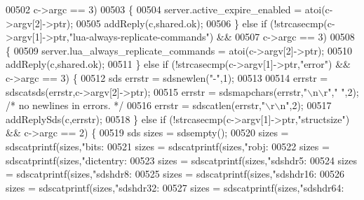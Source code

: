 \begin{DoxyCode}
{{{{{{{{{{{{{{{{{00502                c->argc == 3)
00503     \{
00504         server.active\_expire\_enabled = atoi(c->argv[2]->ptr);
00505         addReply(c,shared.ok);
00506     \} \textcolor{keywordflow}{else} \textcolor{keywordflow}{if} (!strcasecmp(c->argv[1]->ptr,\textcolor{stringliteral}{"lua-always-replicate-commands"}) &&
00507                c->argc == 3)
00508     \{
00509         server.lua\_always\_replicate\_commands = atoi(c->argv[2]->ptr);
00510         addReply(c,shared.ok);
00511     \} \textcolor{keywordflow}{else} \textcolor{keywordflow}{if} (!strcasecmp(c->argv[1]->ptr,\textcolor{stringliteral}{"error"}) && c->argc == 3) \{
00512         sds errstr = sdsnewlen(\textcolor{stringliteral}{"-"},1);
00513 
00514         errstr = sdscatsds(errstr,c->argv[2]->ptr);
00515         errstr = sdsmapchars(errstr,\textcolor{stringliteral}{"\(\backslash\)n\(\backslash\)r"},\textcolor{stringliteral}{"  "},2); \textcolor{comment}{/* no newlines in errors. */}
00516         errstr = sdscatlen(errstr,\textcolor{stringliteral}{"\(\backslash\)r\(\backslash\)n"},2);
00517         addReplySds(c,errstr);
00518     \} \textcolor{keywordflow}{else} \textcolor{keywordflow}{if} (!strcasecmp(c->argv[1]->ptr,\textcolor{stringliteral}{"structsize"}) && c->argc == 2) \{
00519         sds sizes = sdsempty();
00520         sizes = sdscatprintf(sizes,\textcolor{stringliteral}{"bits:%
00521         sizes = sdscatprintf(sizes,\textcolor{stringliteral}{"robj:%
00522         sizes = sdscatprintf(sizes,\textcolor{stringliteral}{"dictentry:%
00523         sizes = sdscatprintf(sizes,\textcolor{stringliteral}{"sdshdr5:%
00524         sizes = sdscatprintf(sizes,\textcolor{stringliteral}{"sdshdr8:%
00525         sizes = sdscatprintf(sizes,\textcolor{stringliteral}{"sdshdr16:%
00526         sizes = sdscatprintf(sizes,\textcolor{stringliteral}{"sdshdr32:%
00527         sizes = sdscatprintf(sizes,\textcolor{stringliteral}{"sdshdr64:%
}}}}}}}}}}}}}}}}}}}}}}}}}
\end{DoxyCode}
